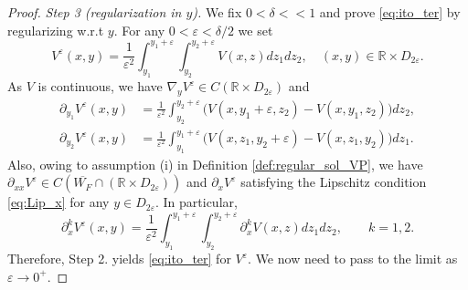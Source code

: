 \documentclass[10pt]{article}
\numberwithin{equation}{section}
\theoremstyle{plain}
\numberwithin{theorem}{section}
\theoremstyle{definition}
\def \R {\mathbb{R}}
\def \p {\partial}
\newcommand{\<}{\langle}
\renewcommand{\>}{\rangle}
\renewcommand{\(}{\left(}
\renewcommand{\)}{\right)}
\newcommand\eps{\varepsilon}
\def \R  {{\mathbb {R}}}
\def \eps {{\varepsilon}}
\def \p {{\partial}}
\def \R {{\mathbb {R}}}
\def \eps {{\varepsilon}}
\begin{document}
{{{\begin{proof}
\emph{Step 3 (regularization in $y$).} We fix $0<\delta<<1$ and prove \eqref{eq:ito_ter} by
regularizing w.r.t $y$. For any $0<\eps<\delta/2$ we set
\begin{equation}
{{V}^{\eps}(x,y)=\frac{1}{\eps^2}\int_{y_1}^{y_1+\eps}\int_{y_2}^{y_2+\eps}{V}(x,z)dz_1dz_2, \quad (x,y)\in \R\times D_{2\eps}.}
\end{equation}
As $V$ is continuous, we have $\nabla_{y}{V}^{\eps} \in C (\R\times  D_{2\eps})$ and
\begin{align}
\p_{y_1}{ V}^{\eps}(x,y)&=\frac{1}{\eps^2}\int_{y_2}^{y_2+\eps}\big({ V}(x,y_1+\eps,z_2)-{ V}(x,y_1,z_2)\big)dz_2, \label{E3}\\
\p_{y_2}{ V}^{\eps}(x,y)&=\frac{1}{\eps^2}\int_{y_1}^{y_1+\eps}\big({ V}(x,z_1,y_2+\eps)-{ V}(x,z_1,y_2)\big)dz_1.\label{E4}
\end{align}
Also, owing to assumption (i) in Definition \ref{def:regular_sol_VP}, we have $\partial_{xx}V^{\eps}\in C(\overline{W_F} \cap (\R\times D_{2\eps}))$ and $\partial_{x}V^{\eps} $ satisfying the Lipschitz condition \eqref{eq:Lip_x} for any $y\in D_{2\eps}$. In particular,
\begin{equation}
\p^k_{x}{V}^{\eps}(x,y)=\frac{1}{\eps^2}\int_{y_1}^{y_1+\eps}\int_{y_2}^{y_2+\eps}\p^k_{x}{V}(x,z)dz_1dz_2, \qquad k=1,2.\label{E2}
\end{equation}
Therefore, Step 2. yields \eqref{eq:ito_ter} for $V^{\eps}$. We now need to pass to the limit as $\eps\to 0^+$.


\end{proof}}}}
\end{document}
